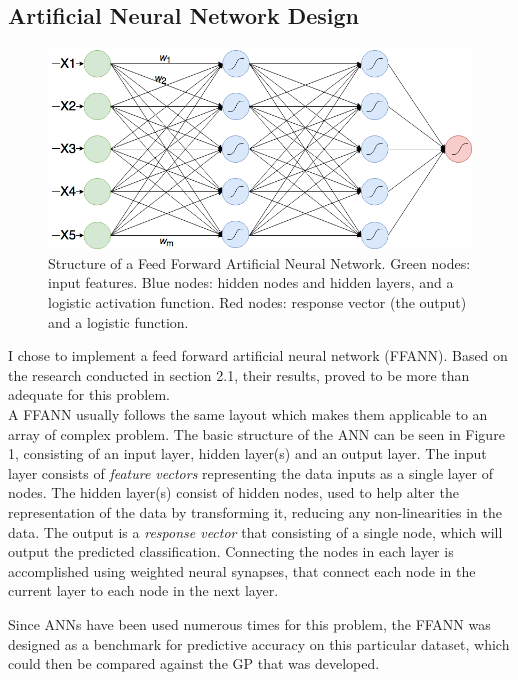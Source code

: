 \documentclass[11pt]{article}
\begin{document}
\subsection{Artificial Neural Network Design}
\begin{figure}[h]
\centering
\captionsetup{justification=centering}
\includegraphics[scale = .37]{ANN}%
\caption{Structure of a Feed Forward Artificial Neural Network. Green nodes: input features. Blue nodes: hidden nodes and hidden layers, and a logistic activation function. Red nodes: response vector (the output) and a logistic function.} 
\end{figure}
I chose to implement a feed forward artificial neural network (FFANN). Based on the research conducted in section 2.1, their results, proved to be more than adequate for this problem.\\
A FFANN usually follows the same layout which makes them applicable to an array of complex problem. The basic structure of the ANN can be seen in Figure 1, consisting of an input layer, hidden layer(s) and an output layer. The input layer consists of \textit{feature vectors} representing the data inputs as a single layer of nodes. The hidden layer(s) consist of hidden nodes, used to help alter the representation of the data by transforming it, reducing any non-linearities in the data. The output is a \textit{response vector} that consisting of a single node, which will output the predicted classification. Connecting the nodes in each layer is accomplished using weighted neural synapses, that connect each node in the current layer to each node in the next layer. 

Since ANNs have been used numerous times for this problem, the FFANN was designed as a benchmark for predictive accuracy on this particular dataset, which could then be compared against the GP that was developed. 
\end{document}
